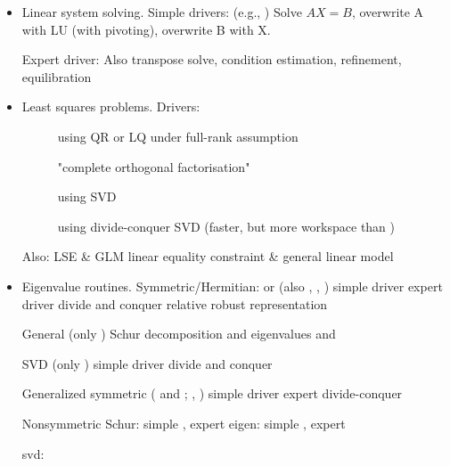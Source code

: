 \begin{itemize}
\item Linear system solving.
Simple drivers:  (e.g., ) 
Solve $AX=B$, overwrite A with LU (with pivoting),
overwrite B with X.

Expert driver: 
Also transpose solve, condition estimation, refinement, equilibration
\item Least squares problems.
Drivers: 
\begin{description}
\item[] using QR or LQ under full-rank assumption
\item[] "complete orthogonal factorisation"
\item[] using SVD
\item[] using divide-conquer SVD
(faster, but more workspace than )
\end{description}

Also: LSE \& GLM linear equality constraint \& general linear model

\item Eigenvalue routines.
Symmetric/Hermitian:  or  (also , , )
simple driver 
expert driver 
divide and conquer 
relative robust representation 

General (only )
Schur decomposition  and 
eigenvalues  and 

SVD (only )
simple driver 
divide and conquer 

Generalized symmetric ( and ; , )
simple driver 
expert 
divide-conquer 

Nonsymmetric
Schur: simple , expert 
eigen: simple , expert 

svd: 

\end{itemize}


